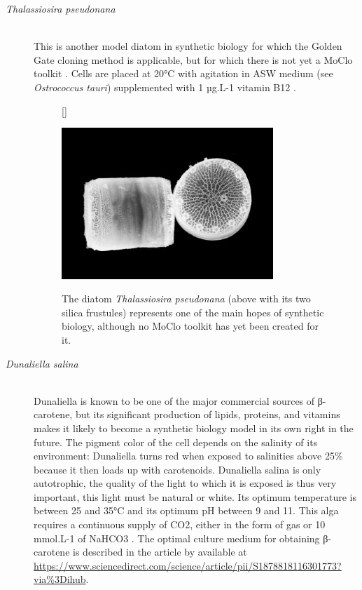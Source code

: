 \begin{description}
\item[\textit{Thalassiosira pseudonana}] \mbox{}\\
This is another model diatom in synthetic biology for which the Golden Gate cloning method is applicable, but for which there is not yet a MoClo toolkit \parencite{Kroth2018}. Cells are placed at 20°C with agitation in ASW medium (see \textit{Ostrococcus tauri}) supplemented with 1 µg.L-1 vitamin B12 \parencite{Cook2015}.
 
 \begin{figure}[!htbp]
[\FBwidth]
{\caption{The diatom \textit{Thalassiosira pseudonana} (above with its two silica frustules) represents one of the main hopes of synthetic biology, although no MoClo toolkit has yet been created for it.}
\label{fig:ch2alg04}}
{\includegraphics[width=8cm]{images/chap2/chap2_alg_04.png}}
\end{figure}
\FloatBarrier
 \noindent
\item[\textit{Dunaliella salina}] \mbox{}\\ 
Dunaliella is known to be one of the major commercial sources of β-carotene, but its significant production of lipids, proteins, and vitamins makes it likely to become a synthetic biology model in its own right in the future. The pigment color of the cell depends on the salinity of its environment: Dunaliella turns red when exposed to salinities above 25\% because it then loads up with carotenoids. Dunaliella salina is only autotrophic, the quality of the light to which it is exposed is thus very important, this light must be natural or white. Its optimum temperature is between 25 and 35°C and its optimum pH between 9 and 11. This alga requires a continuous supply of CO2, either in the form of gas or 10 mmol.L-1 of NaHCO3 \parencite{Hosseini2009}. The optimal culture medium for obtaining β-carotene is described in the article by \parencite{Morowvat2016} available at \href{https://www.sciencedirect.com/science/article/pii/S1878818116301773?via\%3Dihub}{https://www.sciencedirect.com/science/article/pii/S1878818116301773?via\%3Dihub}.


\end{description}
